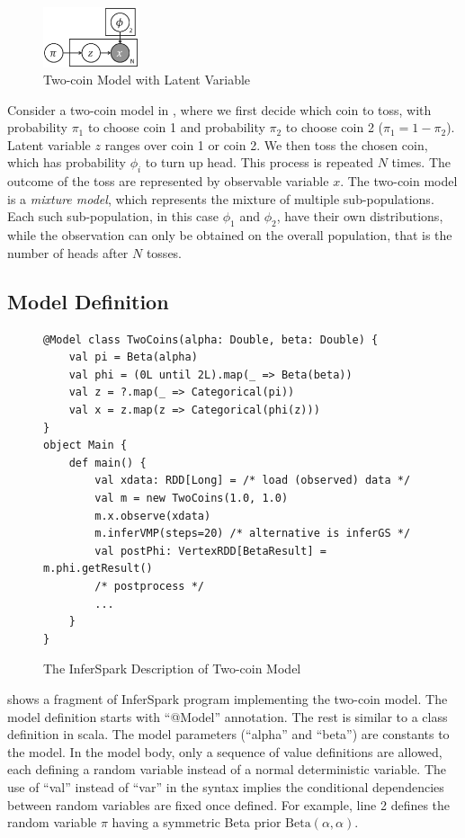 \begin{figure}[th]
	\centering
	\includegraphics[width=0.25\textwidth]{figs/two_coins_latent}
	\caption{Two-coin Model with Latent Variable}
	\label{fig:two_coins}
\end{figure}
Consider a two-coin model in , where we first decide
which coin to toss, with probability $\pi_1$ to choose coin 1 and
probability $\pi_2$ to choose coin 2 ($\pi_1 = 1 - \pi_2$). 
Latent variable $z$ ranges over coin 1 or coin 2. 
We then toss the chosen coin, which has probability $\phi_i$ to turn up head.
This process is repeated $N$ times. The outcome of the toss are represented by observable
variable $x$. The two-coin model is a {\em mixture model}, which represents the
mixture of multiple sub-populations. Each such sub-population, in this case
$\phi_1$ and $\phi_2$, have their own distributions,
while the observation can only be obtained on the overall population, that is
the number of heads after $N$ tosses.


\subsection{Model Definition}
\begin{figure}[th]
\begin{lstlisting}
@Model class TwoCoins(alpha: Double, beta: Double) {
	val pi = Beta(alpha)
	val phi = (0L until 2L).map(_ => Beta(beta))
	val z = ?.map(_ => Categorical(pi))
	val x = z.map(z => Categorical(phi(z)))
}
object Main {
	def main() {
		val xdata: RDD[Long] = /* load (observed) data */
		val m = new TwoCoins(1.0, 1.0)
		m.x.observe(xdata)
		m.inferVMP(steps=20) /* alternative is inferGS */
		val postPhi: VertexRDD[BetaResult] = m.phi.getResult()
		/* postprocess */
		...
	}
}
\end{lstlisting}
\caption{The InferSpark Description of Two-coin Model}
\label{fig:two_coins_modeldef}
\end{figure}

 shows a fragment of InferSpark program implementing
the two-coin model. 
The model definition starts with ``{\sf @Model}'' annotation. 
The rest is similar to a class definition in
scala. The model parameters (``{\sf alpha}'' and ``{\sf beta}'') are constants to the
model. In the model body, only a sequence of value definitions are allowed,
each defining a random variable instead of a normal deterministic variable. 
The use of ``{\sf val}'' instead of ``{\sf var}'' in the syntax 
implies the conditional dependencies between random variables are fixed 
once defined. For example, line 2 defines the random variable 
$\pi$ having a symmetric Beta prior
$\mathrm{Beta}(\alpha, \alpha)$.

